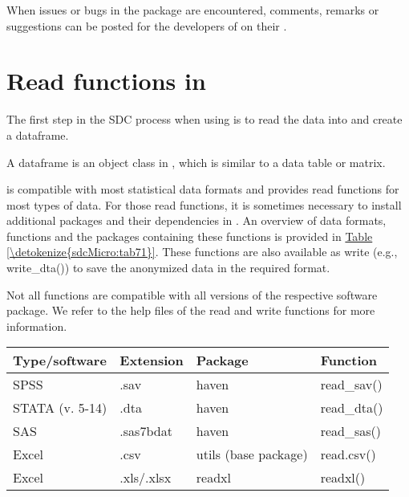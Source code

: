 \documentclass[letterpaper,10pt,english]{sphinxmanual}
\begin{document}
When issues or bugs in the  package are encountered, comments,
remarks or suggestions can be posted for the developers of  on
their .


\section{Read functions in }
\label{\detokenize{sdcMicro:read-functions-in-r}}
The first step in the SDC process when using  is to read the
data into  and create a dataframe. %
\begin{footnote}[2]\sphinxAtStartFootnote
A dataframe is an object class in , which is similar to a data
table or matrix.
%
\end{footnote}  is
compatible with most statistical data formats and provides read
functions for most types of data. For those read functions, it is
sometimes necessary to install additional packages and their
dependencies in . An overview of data formats, functions and the
packages containing these functions is provided in \hyperref[\detokenize{sdcMicro:tab71}]{Table \ref{\detokenize{sdcMicro:tab71}}}. These
functions are also available as write (e.g., write\_dta()) to save the
anonymized data in the required format. %
\begin{footnote}[3]\sphinxAtStartFootnote
Not all functions are compatible with all versions of the respective
software package. We refer to the help files of the read and write
functions for more information.
%
\end{footnote}


\begin{savenotes}\sphinxattablestart
\centering
{}
\label{\detokenize{sdcMicro:tab71}}\label{\detokenize{sdcMicro:id10}}
\sphinxaftercaption
\begin{tabulary}{\linewidth}[t]{|T|T|T|T|}
\hline
\sphinxstyletheadfamily 
Type/software
&\sphinxstyletheadfamily 
Extension
&\sphinxstyletheadfamily 
Package
&\sphinxstyletheadfamily 
Function
\\
\hline
SPSS
&
.sav
&
haven
&
read\_sav()
\\
\hline
STATA (v. 5-14)
&
.dta
&
haven
&
read\_dta()
\\
\hline
SAS
&
.sas7bdat
&
haven
&
read\_sas()
\\
\hline
Excel
&
.csv
&
utils (base package)
&
read.csv()
\\
\hline
Excel
&
.xls/.xlsx
&
readxl
&
readxl()
\\
\hline
\end{tabulary}
\par
\sphinxattableend\end{savenotes}
\end{document}
